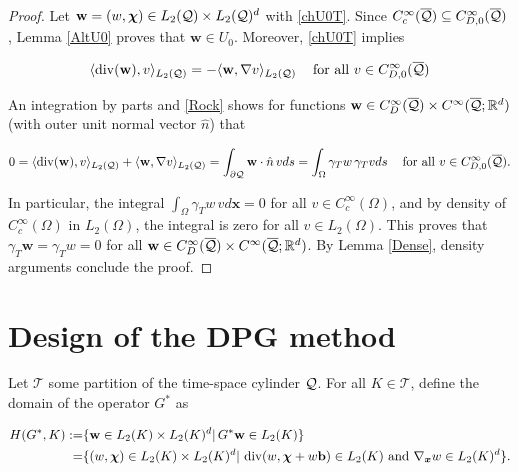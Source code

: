 \begin{proof}
    Let $\mathbf{w}=(w,\boldsymbol{\chi})\in L_2(\mathcal{Q})\times L_2(\mathcal{Q})^d$ with \eqref{chU0T}. Since $C_c^\infty(\overline{\mathcal{Q}})\subseteq C_{D,0}^\infty(\overline{\mathcal{Q}})$, Lemma \ref{AltU0} proves that $\mathbf{w}\in U_0$. Moreover, \eqref{chU0T} implies 

    \begin{equation}\label{Rock}
        \langle \operatorname{div}(\mathbf{w}) , v \rangle_{L_2(\mathcal{Q})}=-\langle \mathbf{w} , \nabla v \rangle_{L_2(\mathcal{Q})}\hspace{0.3 cm}\text{ for all }v\in C_{D,0}^\infty(\overline{\mathcal{Q}})
    \end{equation}

An integration by parts and \eqref{Rock} shows for functions $\mathbf{w}\in C_D^{\infty}(\overline{\mathcal{Q}})\times C^\infty(\overline{\mathcal{Q}};\mathbb{R}^d)$ (with outer unit normal vector $\hat{n}$) that

$$0=\langle \operatorname{div}(\mathbf{w}) , v \rangle_{L_2(\mathcal{Q})}+\langle \mathbf{w} , \nabla v \rangle_{L_2(\mathcal{Q})}=\int_{\partial\mathcal{Q}}\mathbf{w}\cdot\hat{n}\,vds=\int_{\Omega}\gamma_Tw\,\gamma_Tvds\hspace{0.3 cm}\text{ for all }v\in C_{D,0}^\infty(\overline{\mathcal{Q}}).$$

In particular, the integral $\int_{\Omega}\gamma_T w\,vd\mathbf{x}=0$ for all $v\in C_c^\infty(\Omega)$, and by density of $C_c^\infty(\Omega)$ in $L_2(\Omega)$, the integral is zero for all $v\in L_2(\Omega)$. This proves that $\gamma_T\mathbf{w}=\gamma_Tw=0$ for all $\mathbf{w}\in C_D^{\infty}(\overline{\mathcal{Q}})\times C^\infty(\overline{\mathcal{Q}};\mathbb{R}^d)$. By Lemma \ref{Dense}, density arguments conclude the proof.
    
\end{proof}
\vspace{0.3 cm}



\section{Design of the DPG method}

Let $\mathcal{T}$ some partition of the time-space cylinder $\mathcal{Q}$. For all $K\in\mathcal{T}$, define the domain of the operator $G^*$ as



\begin{align*}
    H(G^*,K):=&\{\mathbf{w}\in L_2(K)\times L_2(K)^d|\,G^*\mathbf{w}\in L_2(K)\}\\
    =&\{(w,\boldsymbol{\boldsymbol{\chi}})\in L_2(K)\times L_2(K)^d|\,\operatorname{div}(w, \boldsymbol{\chi}+w\mathbf{b})\in L_2(K)\text{ and }\nabla_{\boldsymbol{x}} w\in L_2(K)^d\}.
\end{align*}


